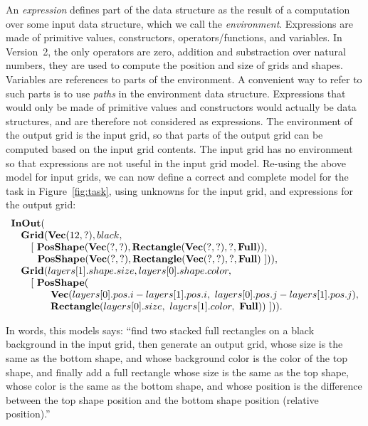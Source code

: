 \documentclass[a4paper]{llncs}
\begin{document}
An {\em expression} defines part of the data structure as the result
of a computation over some input data structure, which we call the
{\em environment}. Expressions are made of primitive values,
constructors, operators/functions, and variables. In Version~2, the
only operators are zero, addition and substraction over natural numbers,
they are used to compute the position and size of grids and shapes.
Variables are references to parts of the environment. A convenient way
to refer to such parts is to use {\em paths} in the environment data
structure.
%
Expressions that would only be made of primitive values and
constructors would actually be data structures, and are therefore not
considered as expressions.
%
The environment of the output grid is the input grid, so that parts of
the output grid can be computed based on the input grid contents. The
input grid has no environment so that expressions are not useful in
the input grid model.
%
Re-using the above model for input grids, we can now define a correct
and complete model for the task in Figure~\ref{fig:task}, using
unknowns for the input grid, and expressions for the output grid:
\[\begin{array}{l}
    {\bf InOut}( \\
    \quad {\bf Grid}({\bf Vec}(12,?), black,\\
    \quad \quad [~{\bf PosShape}({\bf Vec}(?,?), {\bf Rectangle}({\bf Vec}(?, ?), ?, {\bf Full})),\\
    \quad \quad ~~{\bf PosShape}({\bf Vec}(?,?), {\bf Rectangle}({\bf Vec}(?, ?), ?, {\bf Full})~])), \\
    \quad {\bf Grid}(layers[1].shape.size, layers[0].shape.color, \\
    \quad \quad [~ {\bf PosShape}(\\
    \quad \quad \quad \quad {\bf Vec}(layers[0].pos.i - layers[1].pos.i,\ layers[0].pos.j - layers[1].pos.j), \\
    \quad \quad \quad \quad {\bf Rectangle}(layers[0].size,\ layers[1].color,\ {\bf Full})) ~])).
  \end{array} \]

In words, this models says: ``find two stacked full rectangles on a
black background in the input grid, then generate an output grid,
whose size is the same as the bottom shape, and whose background color
is the color of the top shape, and finally add a full rectangle whose
size is the same as the top shape, whose color is the same as the
bottom shape, and whose position is the difference between the top
shape position and the bottom shape position (relative position).''
\end{document}
